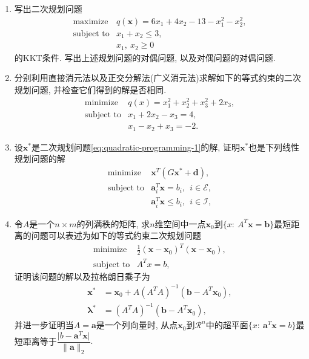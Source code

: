 \documentclass{SBCbookchapter}
\newcommand{\V}[1]{{\bm{#1}}}
\newcommand{\R}{\mathcal{R}}
\numberwithin{equation}{section}
\begin{document}
\begin{enumerate}

\item 写出二次规划问题
\begin{equation*}
\begin{array}{cl}
\text{maximize} & q(\V{x}) = 6x_1 + 4x_2 - 13 - x_1^2 - x_2^2, \\
\text{subject to} & x_1 + x_2 \leqslant 3, \\
& x_1, ~ x_2 \geqslant 0
\end{array}
\end{equation*}
的KKT条件. 写出上述规划问题的对偶问题, 以及对偶问题的对偶问题.

\item 分别利用直接消元法以及正交分解法(广义消元法)求解如下的等式约束的二次规划问题, 并检查它们得到的解是否相同.
\begin{equation*}
\begin{array}{cl}
\text{minimize} & q(x) = x_1^2 + x_2^2 + x_3^2 + 2x_3, \\
\text{subject to} & x_1 + 2x_2 - x_3 = 4, \\
& x_1 - x_2 + x_3 = -2.
\end{array}
\end{equation*}

\item 设$\V{x}^*$是二次规划问题\eqref{eq:quadratic-programming-1}的解, 证明$\V{x}^*$也是下列线性规划问题的解
\begin{equation*}
\begin{array}{cl}
\text{minimize} & \V{x}^T \left( G \V{x}^* + \V{d} \right), \\
\text{subject to} & \V{a}_i^T \V{x} = b_i, ~~ i \in \mathcal{E}, \\
& \V{a}_i^T \V{x} \leqslant b_i, ~~ i \in \mathcal{I},
\end{array}
\end{equation*}

\item 令$A$是一个$n \times m$的列满秩的矩阵, 求$n$维空间中一点$\V{x}_0$到$\{ x : ~ A^T \V{x} = \V{b} \}$最短距离的问题可以表述为如下的等式约束二次规划问题
\begin{equation*}
\begin{array}{cl}
\text{minimize} & \frac{1}{2} \left( \V{x} - \V{x}_0 \right)^T \left( \V{x} - \V{x}_0 \right), \\
\text{subject to} & A^T x = b,
\end{array}
\end{equation*}
证明该问题的解以及拉格朗日乘子为
\begin{equation*}
\begin{aligned}
\V{x}^* & = \V{x}_0 + A \left( A^T A \right)^{-1} \left( \V{b} - A^T \V{x}_0 \right), \\
\V{\lambda}^* & = \left( A^T A \right)^{-1} \left( \V{b} - A^T \V{x}_0 \right),
\end{aligned}
\end{equation*}
并进一步证明当$A = \V{a}$是一个列向量时, 从点$\V{x}_0$到$\R^n$中的超平面$\{ x : ~ \V{a}^T \V{x} = b \}$最短距离等于$\dfrac{\lvert b - \V{a}^T \V{x} \rvert}{\lVert \V{a} \rVert_2}.$


\end{enumerate}
\end{document}
